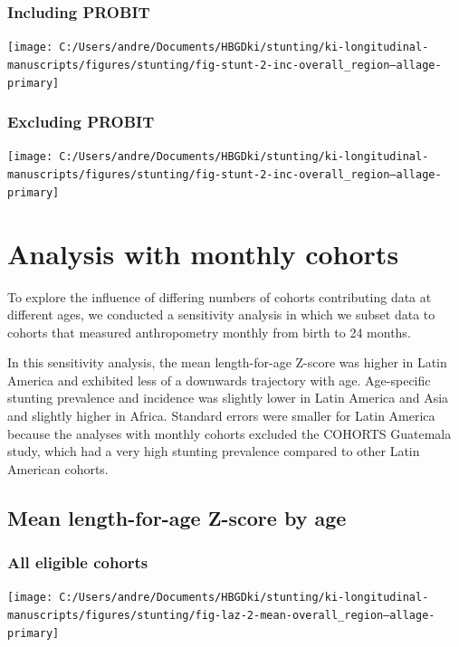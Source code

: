 \documentclass[9pt,]{book}
\begin{document}
\subsection{Including PROBIT}\label{including-probit-2}

\texttt{[image: C:/Users/andre/Documents/HBGDki/stunting/ki-longitudinal-manuscripts/figures/stunting/fig-stunt-2-inc-overall\_region--allage-primary]}

\subsection{Excluding PROBIT}\label{excluding-probit-2}

\texttt{[image: C:/Users/andre/Documents/HBGDki/stunting/ki-longitudinal-manuscripts/figures/stunting/fig-stunt-2-inc-overall\_region--allage-primary]}

\chapter{Analysis with monthly cohorts}\label{monthly}

\raggedright

To explore the influence of differing numbers of cohorts contributing
data at different ages, we conducted a sensitivity analysis in which we
subset data to cohorts that measured anthropometry monthly from birth to
24 months.

In this sensitivity analysis, the mean length-for-age Z-score was higher
in Latin America and exhibited less of a downwards trajectory with age.
Age-specific stunting prevalence and incidence was slightly lower in
Latin America and Asia and slightly higher in Africa. Standard errors
were smaller for Latin America because the analyses with monthly cohorts
excluded the COHORTS Guatemala study, which had a very high stunting
prevalence compared to other Latin American cohorts.

\section{Mean length-for-age Z-score by
age}\label{mean-length-for-age-z-score-by-age-2}

\subsection{All eligible cohorts}\label{all-eligible-cohorts}

\texttt{[image: C:/Users/andre/Documents/HBGDki/stunting/ki-longitudinal-manuscripts/figures/stunting/fig-laz-2-mean-overall\_region--allage-primary]}
\end{document}
